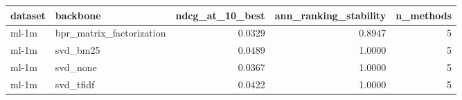 \begin{tabular}{llrrr}
\toprule
dataset & backbone & ndcg_at_10_best & ann_ranking_stability & n_methods \\
\midrule
ml-1m & bpr_matrix_factorization & 0.0329 & 0.8947 & 5 \\
ml-1m & svd_bm25 & 0.0489 & 1.0000 & 5 \\
ml-1m & svd_none & 0.0367 & 1.0000 & 5 \\
ml-1m & svd_tfidf & 0.0422 & 1.0000 & 5 \\
\bottomrule
\end{tabular}
